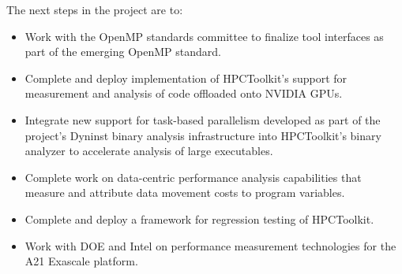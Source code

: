The next steps in the project are to:
\begin{itemize}
\setlength\itemsep{0em}
\item Work with the OpenMP standards committee to finalize tool interfaces as part of the emerging OpenMP standard.
\item Complete and deploy implementation of  HPCToolkit's support for measurement and analysis of code offloaded onto NVIDIA GPUs. 
\item Integrate new support for task-based parallelism developed as part of the project's Dyninst binary analysis infrastructure into HPCToolkit's binary analyzer to accelerate analysis of large executables.
\item Complete work on data-centric performance analysis capabilities that  measure and attribute data movement costs to program variables.
\item Complete and deploy a framework for regression testing of HPCToolkit.
\item Work with DOE and Intel on performance measurement technologies for the A21 Exascale platform.
\end{itemize}
